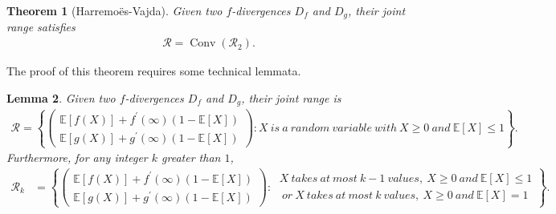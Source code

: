 \documentclass{article}
\numberwithin{equation}{section}
\newcommand{\E}{\mathbb{E}}
\renewcommand{\cal}{\mathcal}
\DeclareMathOperator{\conv}{Conv}
\theoremstyle{plain}
\newtheorem{theorem}{Theorem}[section]
\newtheorem{lemma}[theorem]{Lemma}
\theoremstyle{definition}
\begin{document}
\begin{theorem}[Harremoës-Vajda]\label{jrconvjr2}
Given two $f$-divergences $D_f$ and $D_g$, their joint range satisfies
\begin{align*}
	\cal{R}=\conv(\cal{R}_2).
\end{align*}
\end{theorem}
\newpage
The proof of this theorem requires some technical lemmata.
\begin{lemma}\label{repjr}
Given two $f$-divergences $D_f$ and $D_g$, their joint range is
\begin{align}
\cal{R}=\left\{\begin{pmatrix}
\E[f(X)]+f^\prime(\infty)(1-\E[X])\\
\E[g(X)]+g^\prime(\infty)(1-\E[X])
\end{pmatrix}:X\ is\ a\ random\ variable\ with\ X\geq 0\ and\ \E[X]\leq 1\right\}.
\end{align}
Furthermore, for any integer $k$ greater than $1$,
\begin{align}
\cal{R}_k
&=\left\{\begin{pmatrix}
	\E[f(X)]+f^\prime(\infty)(1-\E[X])\\
	\E[g(X)]+g^\prime(\infty)(1-\E[X])
\end{pmatrix}:\ \begin{matrix}
X\ takes\ at\ most\ k-1\ values,\ X\geq 0\ and\ \E[X]\leq 1\\
\ or\ X\ takes\ at\ most\ k\ values,\ X\geq 0\ and\ \E[X]= 1
\end{matrix}\right\}.
\end{align}
\end{lemma}
\end{document}
